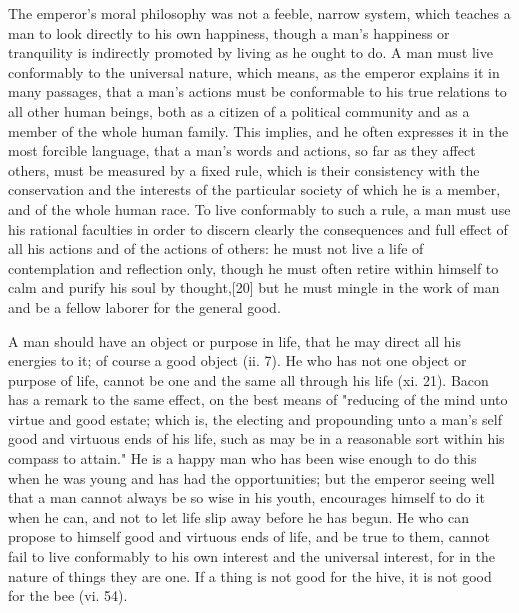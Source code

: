 The emperor's moral philosophy was not a feeble, narrow system, which teaches a man to look directly to his own happiness, though a man's happiness or tranquility is indirectly promoted by living as he ought to do. A man must live conformably to the universal nature, which means, as the emperor explains it in many passages, that a man's actions must be conformable to his true relations to all other human beings, both as a citizen of a political community and as a member of the whole human family. This implies, and he often expresses it in the most forcible language, that a man's words and actions, so far as they affect others, must be measured by a fixed rule, which is their consistency with the conservation and the interests of the particular society of which he is a member, and of the whole human race. To live conformably to such a rule, a man must use his rational faculties in order to discern clearly the consequences and full effect of all his actions and of the actions of others: he must not live a life of contemplation and reflection only, though he must often retire within himself to calm and purify his soul by thought,[20] but he must mingle in the work of man and be a fellow laborer for the general good.

A man should have an object or purpose in life, that he may direct all his energies to it; of course a good object (ii. 7). He who has not one object or purpose of life, cannot be one and the same all through his life (xi. 21). Bacon has a remark to the same effect, on the best means of "reducing of the mind unto virtue and good estate; which is, the electing and propounding unto a man's self good and virtuous ends of his life, such as may be in a reasonable sort within his compass to attain." He is a happy man who has been wise enough to do this when he was young and has had the opportunities; but the emperor seeing well that a man cannot always be so wise in his youth, encourages himself to do it when he can, and not to let life slip away before he has begun. He who can propose to himself good and virtuous ends of life, and be true to them, cannot fail to live conformably to his own interest and the universal interest, for in the nature of things they are one. If a thing is not good for the hive, it is not good for the bee (vi. 54).

